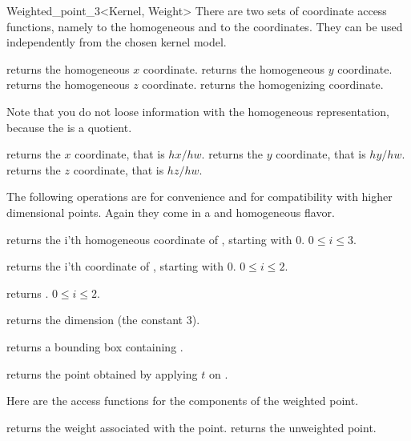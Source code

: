 \begin{ccRefClass} {Weighted_point_3<Kernel, Weight>}
There are two sets of coordinate access functions, namely to the
homogeneous and to the  coordinates. They can be used
independently from the chosen kernel model.

       {returns the homogeneous $x$ coordinate.}
\ccGlue
{}
       {returns the homogeneous $y$ coordinate.}
\ccGlue
{}
       {returns the homogeneous $z$ coordinate.}
\ccGlue
{}
       {returns the homogenizing  coordinate.}

Note that you do not loose information with the homogeneous
representation, because the  is a quotient.

       {returns the  $x$ coordinate, that is $hx/hw$.}
\ccGlue
{}
       {returns the  $y$ coordinate, that is $hy/hw$.}
\ccGlue
{}
       {returns the  $z$ coordinate, that is $hz/hw$.}
       
The following operations are for convenience and for compatibility
with higher dimensional points. Again they come in a
 and homogeneous flavor.

       {returns the i'th homogeneous coordinate of \ccVar, starting with 0.
        \ccPrecond $0\leq i \leq 3$.}

       {returns the i'th  coordinate of \ccVar, starting with 0.
        \ccPrecond $0\leq i \leq 2$.}

       {returns .
        \ccPrecond $0\leq i \leq 2$.}

       {returns the dimension (the constant 3).}

       {returns a bounding box containing \ccVar.}

       {returns the point obtained by applying $t$ on \ccVar.}

Here are the access functions for the components of the weighted point.

       {returns the weight associated with the point.}
\ccGlue
{}
       {returns the unweighted point.}


\end{ccRefClass}

